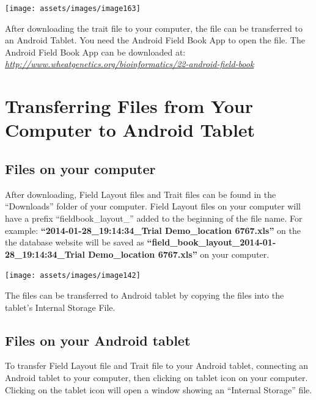 \documentclass[
  12pt,
]{book}
\begin{document}
\begin{center}\texttt{[image: assets/images/image163]} \end{center}

After downloading the trait file to your computer, the file can be transferred to an Android Tablet. You need the Android Field Book App to open the file. The Android Field Book App can be downloaded at: \emph{\url{http://www.wheatgenetics.org/bioinformatics/22-android-field-book}}

\hypertarget{transferring-files-from-your-computer-to-android-tablet}{%
\section{Transferring Files from Your Computer to Android Tablet}\label{transferring-files-from-your-computer-to-android-tablet}}

\hypertarget{files-on-your-computer}{%
\subsection{Files on your computer}\label{files-on-your-computer}}

After downloading, Field Layout files and Trait files can be found in the ``Downloads'' folder of your computer. Field Layout files on your computer will have a prefix ``fieldbook\_layout\_'' added to the beginning of the file name. For example: \textbf{``2014-01-28\_19:14:34\_Trial Demo\_location 6767.xls''} on the the database website will be saved as \textbf{``field\_book\_layout\_2014-01-28\_19:14:34\_Trial Demo\_location 6767.xls''} on your computer.

\begin{center}\texttt{[image: assets/images/image142]} \end{center}

The files can be transferred to Android tablet by copying the files into the tablet's Internal Storage File.

\hypertarget{files-on-your-android-tablet}{%
\subsection{Files on your Android tablet}\label{files-on-your-android-tablet}}

To transfer Field Layout file and Trait file to your Android tablet, connecting an Android tablet to your computer, then clicking on tablet icon on your computer. Clicking on the tablet icon will open a window showing an ``Internal Storage'' file.
\end{document}
